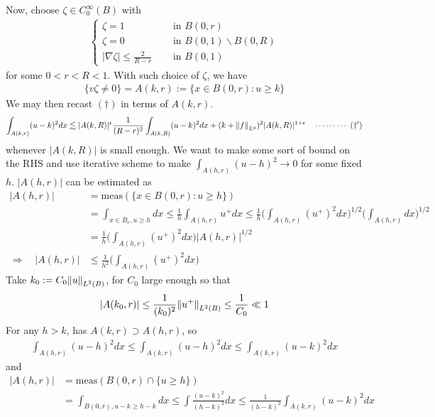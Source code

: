 \documentclass[12pt,a4paper]{article}
\newenvironment{proof}
{\begin{changemargin}{0.5cm}{0.5cm} 
	}%
	{\end{changemargin}
}
\newenvironment{p}
{\begin{proof} 
	}%
	{\end{proof}
}
\begin{document}
\begin{p}
Now, choose $\zeta \in C_0^{\infty}(B)$ with
\begin{align*}
\begin{cases}
\zeta =1 \quad &\text{ in }B(0, r)\\
\zeta =0 \quad &\text{ in }B(0, 1) \backslash B(0, R)\\
|\nabla \zeta| \leq \frac{2}{R-r} \quad &\text{ in }B(0,1)
\end{cases}
\end{align*}
for some $0<r<R<1$. With such choice of $\zeta$, we have
\begin{align*}
\{v \zeta \neq 0 \} =  A(k,r) := \{ x\in B(0, r) : u \geq k\}
\end{align*}
We may then recast $(\dagger)$ in terms of $A(k,r)$.
\begin{align*}
\int_{A(k,r)} (u-k)^2 dx \lesssim |A(k,R)|^{\epsilon} \frac{1}{(R-r)^2} \int_{A(k,R)} (u-k)^2 dx + (k+ \snorms{f}{L^q})^2 |A(k,R)|^{1+ \epsilon} \call{\dagger'}
\end{align*}
whenever $|A(k,R)|$ is small enough. We want to make some sort of bound on the RHS and use iterative scheme to make $\int_{A(h,r)} (u-h)^2 \rightarrow 0$ for some fixed $h$. $|A(h,r)|$ can be estimated as
\begin{align*}
|A(h,r)| &=\text{meas}(\{x\in B(0, r) : u\geq h\}) \\
&= \int_{x\in B_r, u\geq h} dx \leq \frac{1}{h} \int_{A(h,r)} u^+ dx \leq \frac{1}{h} \Big( \int_{A(h,r)} (u^+)^2 dx \Big)^{1/2} \Big(\int_{A(h,r)} dx \Big)^{1/2} \\
&= \frac{1}{h} \Big( \int_{A(h,r)} (u^+)^2 dx \Big) |A(h,r)|^{1/2} \\
\Rightarrow \quad |A(h,r)| &\leq \frac{1}{h^2} \Big( \int_{A(h,r)} (u^+)^2 dx \Big)
\end{align*}
Take $k_0 := C_0 \snorms{u}{L^2(B)}$, for $C_0$ large enough so that
\begin{align*}
|A(k_0,r)| \leq \frac{1}{(k_0)^2} \snorms{u^+}{L^2(B)} \leq \frac{1}{C_0} \ll 1
\end{align*}
For any $h>k$, has $A(k,r) \supset A(h,r)$, so
\begin{align*}
\int_{A(h,r)}(u-h)^2 dx \leq \int_{A(k,r)} (u-h)^2  dx \leq \int_{A(k,r)} (u-k)^2 dx
\end{align*}
and
\begin{align*}
|A(h,r)| &= \text{meas}(B(0,r) \cap \{ u \geq h \}) \\
&= \int_{B(0,r), u-k \geq h-k} dx \leq \int \frac{(u-k)^2}{(h-k)^2} dx \leq \frac{1}{(h-k)^2} \int_{A(k,r)} (u-k)^2 dx

\end{align*}
\end{p}
\end{document}

